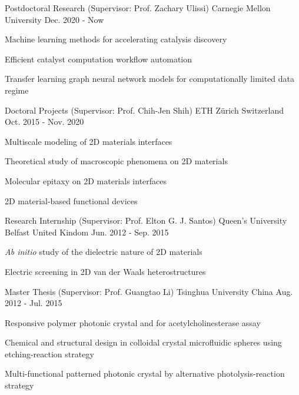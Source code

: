 

\begin{cventries}
\cventry
{Postdoctoral Research (Supervisor: Prof.  Zachary Ulissi)} %
{Carnegie Mellon University} %
{} %
{Dec. 2020 - Now} %
{
  \begin{cvitems}
  \item Machine learning methods for accelerating catalysis discovery
  \item Efficient catalyst computation workflow automation
  \item Transfer learning graph neural network models for computationally limited data regime
  \end{cvitems}
}

\cventry
{Doctoral Projects (Supervisor: Prof.  Chih-Jen Shih)} %
{ETH Z\"{u}rich} %
{Switzerland} %
{Oct. 2015 - Nov. 2020} %
{
  \begin{cvitems}
  \item Multiscale modeling of 2D materials interfaces
  \item Theoretical study of macroscopic phenomena on 2D materials
  \item Molecular epitaxy on 2D materials interfaces
  \item 2D material-based functional devices
  \end{cvitems}
}

\cventry
{Research Internship (Supervisor: Prof.  Elton G. J. Santos)} %
{Queen's University Belfast} %
{United Kindom} %
{Jun. 2012 - Sep. 2015} %
{
  \begin{cvitems}
  \item \textit{Ab initio} study of the dielectric nature of 2D materials
  \item Electric screening in 2D van der Waals heterostructures
  \end{cvitems}
}

\cventry
{Master Thesis (Supervisor: Prof.  Guangtao Li)}
{Tsinghua University}
{China}
{Aug. 2012 - Jul. 2015}
{
  \begin{cvitems}
  \item Responsive polymer photonic crystal and for acetylcholinesterase assay
  \item Chemical and structural design in colloidal crystal microfluidic spheres using etching-reaction strategy
  \item Multi-functional patterned photonic crystal by alternative photolysis-reaction strategy
  \end{cvitems}
}


\end{cventries}
